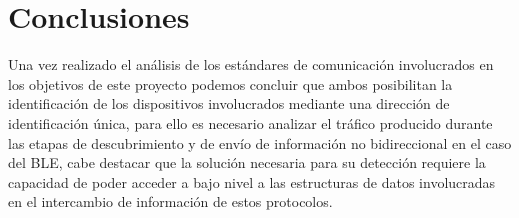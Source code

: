 \documentclass[../proyecto.tex]{subfiles}
\begin{document}
\section{Conclusiones}

Una vez realizado el análisis de los estándares de comunicación involucrados en los objetivos de este proyecto podemos concluir que ambos posibilitan la identificación de los dispositivos involucrados mediante una dirección de identificación única, para ello es necesario analizar el tráfico producido durante las etapas de descubrimiento y de envío de información no bidireccional en el caso del BLE, cabe destacar que la solución necesaria para su detección requiere la capacidad de poder acceder a bajo nivel a las estructuras de datos involucradas en el intercambio de información de estos protocolos.\\
\end{document}
